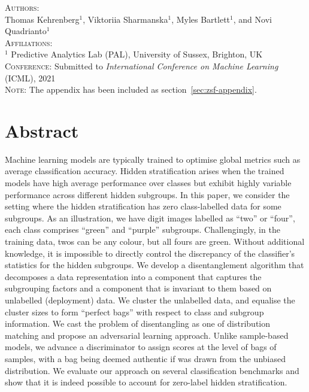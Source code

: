 
\textsc{Authors}:\\
Thomas Kehrenberg$^1$, Viktoriia Sharmanska$^1$, Myles Bartlett$^1$, and Novi Quadrianto$^1$ \\
\textsc{Affiliations}:\\
$^1$ Predictive Analytics Lab (PAL), University of Sussex, Brighton, UK\\
\textsc{Conference}:\;\; Submitted to \textit{International Conference on Machine Learning} (ICML), 2021 \\
\textsc{Note}:\;\; The appendix has been included as section~\ref{sec:zsf-appendix}.

\section{Abstract}
Machine learning models are typically trained to optimise global metrics such as average classification accuracy. 
%
Hidden stratification arises when the trained models have high average performance over classes but exhibit highly variable performance across different hidden subgroups.
%
In this paper, we consider the setting where the hidden stratification has zero class-labelled data for some subgroups. 
As an illustration, we have digit images labelled as ``two'' or ``four'', each class comprises ``green'' and ``purple'' subgroups.
%
Challengingly, in the training data, twos can be any colour, but all fours are green. 
%
Without additional knowledge, it is impossible to directly control the discrepancy of the classifier’s statistics for the hidden subgroups. 
%
We develop a disentanglement algorithm that decomposes a data representation into a component that captures the subgrouping factors and a component that is invariant to them based on unlabelled (deployment) data. 
%
We cluster the unlabelled data, and equalise the cluster sizes to form ``perfect bags'' with respect to class and subgroup information.
%
We cast the problem of disentangling as one of distribution matching and propose an adversarial learning approach.
%
%
Unlike sample-based models, we advance a discriminator to assign scores at the level of bags of samples, with a bag being deemed authentic if was drawn from the unbiased distribution. 
%
We evaluate our approach on several classification benchmarks and show that it is indeed possible to account for zero-label hidden stratification.

